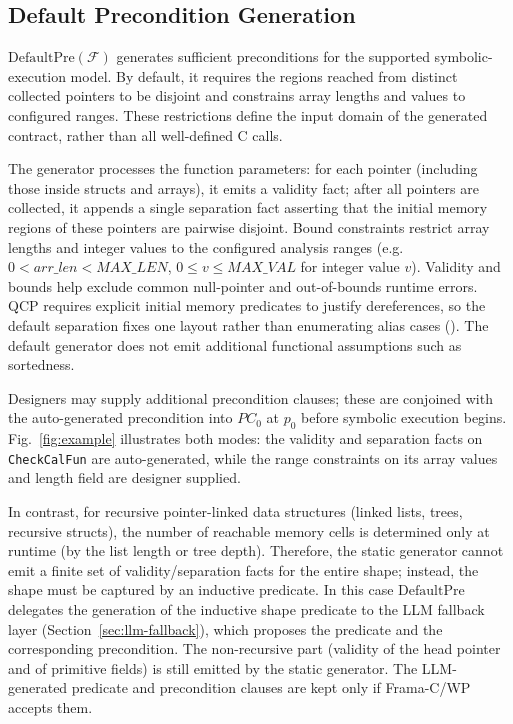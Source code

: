 \subsection{Default Precondition Generation}
\label{sec:default-pre}
{$\mathrm{DefaultPre}(\mathcal{F})$ generates sufficient preconditions for the supported symbolic-execution model. By default, it requires the regions reached from distinct collected pointers to be disjoint and constrains array lengths and values to configured ranges. These restrictions define the input domain of the generated contract, rather than all well-defined C calls.}

The generator processes the function parameters: for each pointer (including those inside structs and arrays), it emits a validity fact; after all pointers are collected, it appends a single separation fact asserting that the initial memory regions of these pointers are pairwise disjoint. {Bound constraints restrict array lengths and integer values to the configured analysis ranges} (e.g.\ $0 < \mathit{arr\_len} < \mathit{MAX\_LEN}$, $0 \le v \le \mathit{MAX\_VAL}$ for integer value $v$). Validity and bounds help exclude common null-pointer and out-of-bounds runtime errors. QCP requires explicit initial memory predicates to justify dereferences, so the default separation fixes one layout rather than enumerating alias cases (). {The default generator does not emit additional functional assumptions such as sortedness.}



Designers may supply additional precondition clauses; these are conjoined with the auto-generated precondition into $PC_0$ at $p_0$ before symbolic execution begins. Fig.~\ref{fig:example} illustrates both modes: the validity and separation facts on \texttt{CheckCalFun} are auto-generated, while the range constraints on its array values and length field are designer supplied.

In contrast, for recursive pointer-linked data structures (linked lists, trees, recursive structs), the number of reachable memory cells is determined only at runtime (by the list length or tree depth). Therefore, the static generator cannot emit a finite set of validity/separation facts for the entire shape; instead, the shape must be captured by an inductive predicate. In this case $\mathrm{DefaultPre}$ delegates the generation of the inductive shape predicate to the LLM fallback layer (Section~\ref{sec:llm-fallback}), which proposes the predicate and the corresponding precondition. The non-recursive part (validity of the head pointer and of primitive fields) is still emitted by the static generator. The LLM-generated predicate and precondition clauses are kept only if Frama-C/WP accepts them.

 
